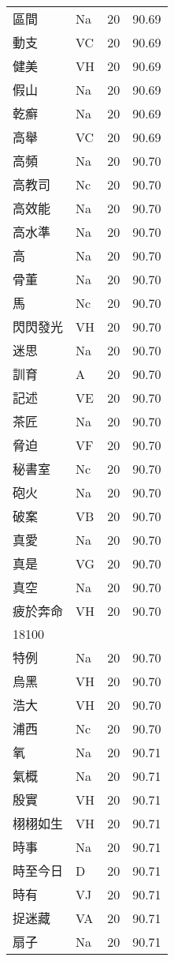 \documentclass[twocolumn]{book}
\begin{document}
\begin{supertabular}{llrr}
區間 & Na & 20 &  90.69\\
動支 & VC & 20 &  90.69\\
健美 & VH & 20 &  90.69\\
假山 & Na & 20 &  90.69\\
乾癬 & Na & 20 &  90.69\\
高舉 & VC & 20 &  90.69\\
高頻 & Na & 20 &  90.70\\
高教司 & Nc & 20 &  90.70\\
高效能 & Na & 20 &  90.70\\
高水準 & Na & 20 &  90.70\\
高 & Na & 20 &  90.70\\
骨董 & Na & 20 &  90.70\\
馬 & Nc & 20 &  90.70\\
閃閃發光 & VH & 20 &  90.70\\
迷思 & Na & 20 &  90.70\\
訓育 & A & 20 &  90.70\\
記述 & VE & 20 &  90.70\\
茶匠 & Na & 20 &  90.70\\
脅迫 & VF & 20 &  90.70\\
秘書室 & Nc & 20 &  90.70\\
砲火 & Na & 20 &  90.70\\
破案 & VB & 20 &  90.70\\
真愛 & Na & 20 &  90.70\\
真是 & VG & 20 &  90.70\\
真空 & Na & 20 &  90.70\\
疲於奔命 & VH & 20 &  90.70\\
18100\\
特例 & Na & 20 &  90.70\\
烏黑 & VH & 20 &  90.70\\
浩大 & VH & 20 &  90.70\\
浦西 & Nc & 20 &  90.70\\
氧 & Na & 20 &  90.71\\
氣概 & Na & 20 &  90.71\\
殷實 & VH & 20 &  90.71\\
栩栩如生 & VH & 20 &  90.71\\
時事 & Na & 20 &  90.71\\
時至今日 & D & 20 &  90.71\\
時有 & VJ & 20 &  90.71\\
捉迷藏 & VA & 20 &  90.71\\
扇子 & Na & 20 &  90.71\\

\end{supertabular}
\end{document}
